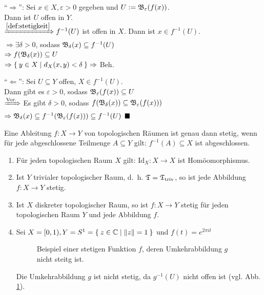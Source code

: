 \begin{beweis}
    \enquote{$\Rightarrow$}: Sei $x \in X, \varepsilon > 0$ gegeben
    und $U := \mathfrak{B}_\varepsilon(f(x))$.\\
    Dann ist $U$ offen in $Y$.\\
    $\xRightarrow{\ref{def:stetigkeit}} f^{-1}(U)$  ist 
    offen in $X$. Dann ist $x \in f^{-1}(U)$.\\
    $\Rightarrow \exists \delta > 0$, sodass 
    $\mathfrak{B}_\delta(x) \subseteq f^{-1} (U)$\\
    $\Rightarrow f(\mathfrak{B}_\delta(x)) \subseteq U$\\
    $\Rightarrow \Set{y \in X | d_X(x,y) < \delta} \Rightarrow$ Beh.

    \enquote{$\Leftarrow$}: Sei $U \subseteq Y$ offen, $X \in f^{-1}(U)$.\\
    Dann gibt es $\varepsilon > 0$, sodass $\mathfrak{B}_\varepsilon(f(x)) \subseteq U$\\
    $\xRightarrow{\text{Vor.}}$ Es gibt $\delta > 0$, sodass
    $f(\mathfrak{B}_\delta(x)) \subseteq \mathfrak{B}_\varepsilon (f(x)))$\\
    $\Rightarrow \mathfrak{B}_\delta(x) \subseteq f^{-1}(\mathfrak{B}_\varepsilon(f(x))) \subseteq f^{-1}(U)$
    $\qed$
\end{beweis}

\begin{bemerkung}
    Eine Ableitung $f: X \rightarrow Y$ von topologischen Räumen ist
    genau dann stetig, wenn für jede abgeschlossene Teilmenge $A \subseteq Y$
    gilt: $f^{-1}(A) \subseteq X$ ist abgeschlossen.
\end{bemerkung}

\begin{beispiel}
    \begin{enumerate}[label=\arabic*)]
        \item Für jeden topologischen Raum $X$ gilt: $\text{Id}_X : X \rightarrow X$
              ist Homöomorphismus.
        \item Ist $Y$ trivialer topologischer Raum, d.~h. $\mathfrak{T} = \mathfrak{T}_\text{triv}$,
              so ist jede Abbildung $f:X \rightarrow Y$ stetig.
        \item Ist $X$ diskreter topologischer Raum, so ist $f:X \rightarrow Y$
              stetig für jeden topologischen Raum $Y$ und jede Abbildung $f$.
        \item Sei $X = [0, 1), Y = S^1 = \Set{z \in \ensuremath{\mathbb{C}}| \|z\| = 1}$
              und $f(t) = e^{2 \pi i t}$
              \begin{figure}
                \centering
                
                \caption{Beispiel einer stetigen Funktion $f$, deren 
                         Umkehrabbildung $g$ nicht steitg ist.}
                \label{fig:nicht-stetige-umkehrabbildung}
              \end{figure}
              Die Umkehrabbildung $g$ ist nicht stetig, da $g^{-1}(U)$
              nicht offen ist (vgl. Abb. \ref{fig:nicht-stetige-umkehrabbildung}).
    \end{enumerate}
\end{beispiel}

